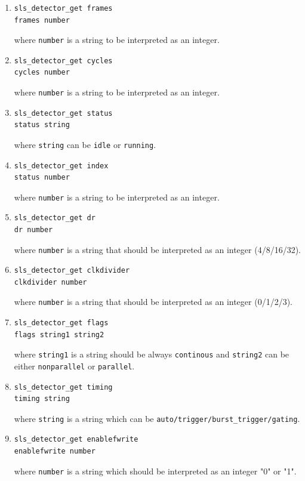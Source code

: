 \documentclass{article}
\begin{document}
{{{\begin{enumerate}
\item \begin{verbatim}
sls_detector_get frames
frames number 
\end{verbatim}
where {\tt{number}} is a string to be interpreted as an integer.

\item \begin{verbatim}
sls_detector_get cycles
cycles number 
\end{verbatim}
where {\tt{number}} is a string to be interpreted as an integer.

\item \begin{verbatim}
sls_detector_get status
status string 
\end{verbatim}
where {\tt{string}} can be {\tt{idle}} or {\tt{running}}.

\item \begin{verbatim}
sls_detector_get index
status number
\end{verbatim}
where {\tt{number}} is a string to be interpreted as an integer.

\item \begin{verbatim}
sls_detector_get dr
dr number
\end{verbatim}
where {\tt{number}} is a string that should be interpreted as an integer (4/8/16/32).

\item \begin{verbatim}
sls_detector_get clkdivider
clkdivider number
\end{verbatim}
where {\tt{number}} is a string that should be interpreted as an integer (0/1/2/3).

\item \begin{verbatim}
sls_detector_get flags
flags string1 string2 
\end{verbatim}
where {\tt{string1}} is a string should be always {\tt{continous}} and {\tt{string2}} can be either {\tt{nonparallel}} or {\tt{parallel}}.

\item \begin{verbatim}
sls_detector_get timing 
timing string
\end{verbatim}
where {\tt{string}} is a string which can be {\tt{auto/trigger/burst\_trigger/gating}}.

\item \begin{verbatim}
sls_detector_get enablefwrite
enablefwrite number
\end{verbatim}
where {\tt{number}} is a string which should be interpreted as an integer "0" or "1".


\end{enumerate}}}}
\end{document}
